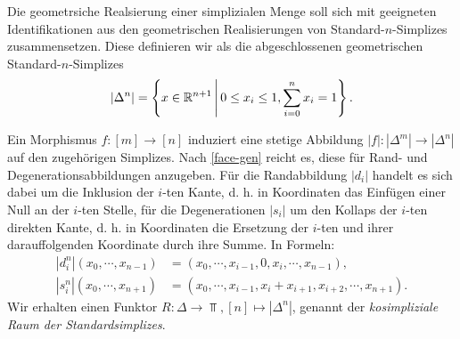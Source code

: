 Die geometrsiche Realsierung einer simplizialen Menge soll sich mit
geeigneten Identifikationen aus den geometrischen Realisierungen von
Standard-$n$-Simplizes zusammensetzen. Diese definieren wir als die
abgeschlossenen geometrischen Standard-$n$-Simplizes
\[ |\Delta^n| = \left\{ x \in \mathbb{R}^{n+1} \,\middle|\, 0 \leq x_i \leq 1, \sum_{i=0}^n x_i = 1 \right\}. \]

Ein Morphismus $f: [m] \to [n]$ induziert eine stetige Abbildung $|f|:
|\Delta^m| \to |\Delta^n|$ auf den zugehörigen Simplizes. Nach
\ref{face-gen} reicht es, diese für Rand- und Degenerationsabbildungen
anzugeben. Für die Randabbildung $|d_i|$ handelt es sich dabei um die
Inklusion der $i$-ten Kante, d. h. in Koordinaten das Einfügen einer
Null an der $i$-ten Stelle, für die Degenerationen $|s_i|$ um den
Kollaps der $i$-ten direkten Kante, d. h. in Koordinaten die Ersetzung
der $i$-ten und ihrer darauffolgenden Koordinate durch ihre Summe. In
Formeln:
\begin{align*}
  |d_i^n|(x_0, \cdots, x_{n-1})
  &= (x_0, \cdots, x_{i-1}, 0, x_i, \cdots, x_{n-1}), \\
  |s_i^n|(x_0, \cdots, x_{n+1})
  &= (x_0, \cdots, x_{i-1}, x_i + x_{i+1}, x_{i+2}, \cdots, x_{n+1}).
\end{align*}
Wir erhalten einen Funktor $R: \Delta \to \Top, [n] \mapsto
|\Delta^n|$, genannt der \emph{kosimpliziale Raum der
  Standardsimplizes}.

